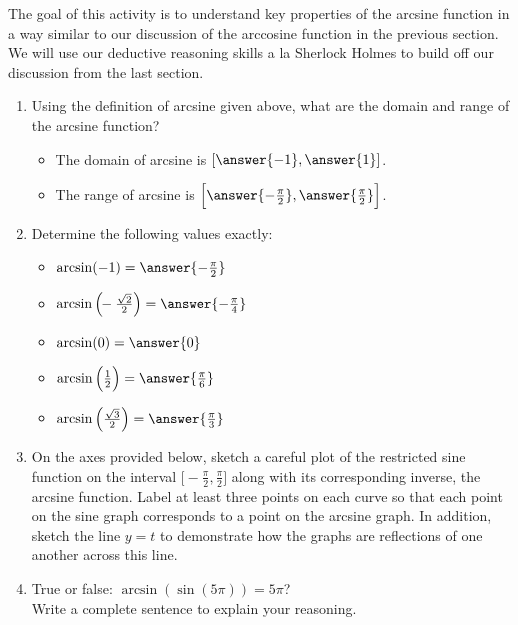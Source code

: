 \documentclass{ximera}
\begin{document}
\begin{problem}
The goal of this activity is to understand key properties of the arcsine function in a way similar to our discussion of the arccosine function in the previous section. We will use our deductive reasoning skills a la Sherlock Holmes to build off our discussion from the last section.%
\begin{enumerate}
\item
Using the definition of arcsine given above, what are the domain and range of the arcsine function? \\
\begin{itemize}
\item The domain of arcsine is $[\answer{-1} , \answer{1}]$.
%
\item The range of arcsine is $\Big[\answer{-\frac{\pi}{2}},\answer{\frac{\pi}{2}}\Big]$.
\end{itemize}
%
\item Determine the following values exactly: 
\begin{itemize}
\item $\arcsin(-1) = \answer{-\frac{\pi}{2}}$ 
%
\item $\arcsin\Big(\!\!-\frac{\sqrt{2}}{2}\Big) = \answer{-\frac{\pi}{4}}$
%
\item $\arcsin(0) = \answer{0}$
%
\item $\arcsin\Big(\frac{1}{2}\Big) = \answer{\frac{\pi}{6}}$
%
\item $\arcsin\Big(\frac{\sqrt{3}}{2}\Big) = \answer{\frac{\pi}{3}}$
\end{itemize}
%
\item
On the axes provided below, sketch a careful plot of the restricted sine function on the interval $\Big[\!\!-\!\frac{\pi}{2},\frac{\pi}{2}\Big]$ along with its corresponding inverse, the arcsine function.  Label at least three points on each curve so that each point on the sine graph corresponds to a point on the arcsine graph.  In addition, sketch the line $y = t$ to demonstrate how the graphs are reflections of one another across this line.
%
%
\item True or false: $\arcsin(\sin(5\pi)) = 5\pi$?  \\
Write a complete sentence to explain your reasoning.%
\end{enumerate}

\end{problem}
\end{document}
